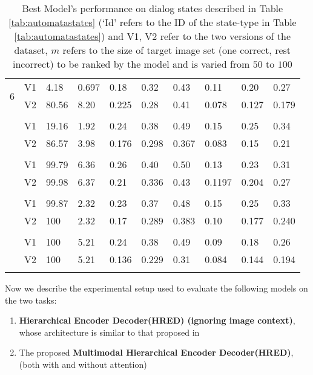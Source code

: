 \documentclass[letterpaper]{article} %
\begin{document}
\begin{table}[!ht]
{\begin{tabular}{|p{0.23cm}|p{0.38cm}|p{0.45cm}|p{0.42cm}|p{0.42cm}|p{0.42cm}|p{0.42cm}|p{0.423cm}|p{0.42cm}|p{0.42cm}|}
 \multirow{2}{0.23cm}{6} & V1 	& 4.18	& 0.697 & 0.18 & 0.32 & 0.43	 & 0.11 & 0.20 & 0.27\\ \cline{2-10}
 & V2 	& 80.56 &	8.20 & 0.225 & 0.28 & 0.41 & 0.078 & 0.127 & 0.179 	\\  
 & & & & & & & & &  \\ \Xhline{2.7\arrayrulewidth}  
   

\multirow{2}{0.23cm}{13} 
& V1	&19.16	& 1.92 & 0.24 & 0.38 & 0.49 & 0.15 & 0.25 &0.34 \\ \cline{2-10}
& V2 &	86.57&	3.98 & 0.176 & 0.298 & 0.367 & 0.083 & 0.15 & 0.21\\  
 & & & & & & & & &  \\ \Xhline{2.7\arrayrulewidth}  
 
\multirow{2}{0.23cm}{7}
 & V1 & 	99.79 &	6.36 & 0.26 & 0.40 & 0.50 &0.13 &0.23 &0.31	\\ \cline{2-10}
  & V2 &  99.98 &	6.37 &0.21 & 0.336 & 0.43 &  0.1197 & 0.204 & 0.27	\\  
 & & & & & & & & &  \\ \Xhline{2.7\arrayrulewidth}  
 
\multirow{2}{0.23cm}{8}
 & V1 & 	99.87	& 2.32	& 0.23 & 0.37 & 0.48 & 0.15 & 0.25 & 0.33\\ \cline{2-10}
  & V2 	& 100 & 	2.32 & 0.17 & 0.289 & 0.383 & 0.10 & 0.177 & 0.240 \\  
 & & & & & & & & &  \\ \Xhline{2.7\arrayrulewidth}  
 
\multirow{2}{0.23cm}{12} 
& V1	&100	&5.21	 & 0.24 & 0.38 & 0.49 & 0.09 & 0.18 & 0.26\\ \cline{2-10}
& V2 	& 100 &	5.21 &0.136 & 0.229 & 0.31 & 0.084 & 0.144 & 0.194  \\  
 & & & & & & & & &  \\ \hline 

 \end{tabular}
}
\caption{\label{tab:statewiseresults} Best Model's performance on dialog states described in Table \ref{tab:automatastates} (`Id' refers to the ID of the state-type in Table \ref{tab:automatastates}) and V1, V2 refer to the two versions of the dataset, $m$ refers to the size of target image set (one correct, rest incorrect) to be ranked by the model and is varied from $50$ to $100$} 
\end{table}


Now we describe the experimental setup used to evaluate the following models on the two tasks:
\begin{enumerate}[$\bullet$,leftmargin=*,topsep=0pt]
\item \textbf{Hierarchical Encoder Decoder(HRED) (ignoring image context)}, whose architecture is similar to that proposed in \cite{Serban:2016:BED:3016387.3016435} %
\item The proposed \textbf{Multimodal Hierarchical Encoder Decoder(HRED)}, (both with and without attention)
\end{enumerate}
\end{document}
